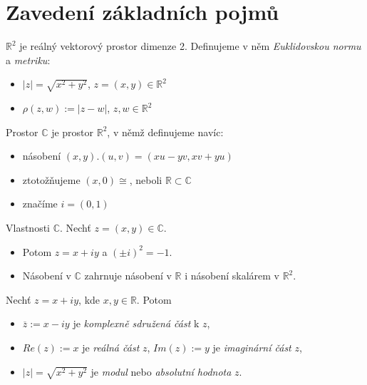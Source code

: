 \section{\texorpdfstring{Zavedení základních pojmů}{Zavedení základních pojmu}}
\vspace{5mm}
\large


\textbf{$\mathbb{R}^2$} je reálný vektorový prostor dimenze 2. Definujeme v něm \emph{Euklidovskou normu} a \emph{metriku}:
\begin{itemize}
    \item $|z| = \sqrt{x^2+y^2}$, $z = (x,y)\in\mathbb{R}^2$
    \item $\rho(z,w):= |z-w|$, $z,w\in\mathbb{R}^2$
\end{itemize}

\begin{definition}
Prostor $\mathbb{C}$ je prostor $\mathbb{R}^2$, v němž definujeme navíc:
\begin{itemize}
    \item násobení $(x,y).(u,v) = (xu-yv, xv+yu)$
    \item ztotožňujeme $(x,0) \cong$, neboli $\mathbb{R}\subset\mathbb{C}$
    \item značíme $i = (0,1)$
\end{itemize}
\end{definition}

\begin{properties}
Vlastnosti $\mathbb{C}$. Nechť $z = (x,y)\in\mathbb{C}$.
\begin{itemize}
    \item Potom $z = x+iy$ a $(\pm i)^2 = -1$.
    \item Násobení v $\mathbb{C}$ zahrnuje násobení v $\mathbb{R}$ i násobení skalárem v $\mathbb{R}^2$.
\end{itemize}
\end{properties}


\begin{notation}
Nechť $z = x+iy$, kde $x,y\in\mathbb{R}$. Potom
\begin{itemize}
    \item $\overline{z}:= x-iy$ je \textit{komplexně sdružená část} k $z$,
    \item $Re(z):= x$ je \textit{reálná část} $z$, $Im(z):= y$ je \textit{imaginární část} $z$,
    \item $|z| = \sqrt{x^2+y^2}$ je \textit{modul} nebo \textit{absolutní hodnota} $z$.
\end{itemize}
\end{notation} 

